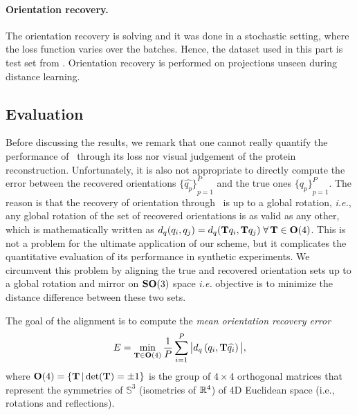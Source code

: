 \paragraph{Orientation recovery.}
The orientation recovery is solving  and it was done in a stochastic setting, where the loss function varies over the batches.
Hence, the dataset used in this part is test set from .
Orientation recovery is performed on projections unseen during distance learning.

\subsection{Evaluation}\label{sec:results:evaluation}



Before discussing the results, we remark that one cannot really quantify the performance of~ through its loss nor visual judgement of the protein reconstruction.
Unfortunately, it is also not appropriate to directly compute the error between the recovered orientations ${\big\{\widehat{q_p}\big\}}_{p=1}^P$ and the true ones ${\big\{q_p\big\}}_{p=1}^P$.
The reason is that the recovery of orientation through~ is up to a global rotation, \textit{i.e.}, any global rotation of the set of recovered orientations is as valid as any other, which is mathematically written as $d_q(q_i, q_j) = d_q(\mathbf{T} q_i , \mathbf{T} q_j) \; \forall \, \mathbf{T} \in \mathrm{\mathbf{O}}(4)$.
This is not a problem for the ultimate application of our scheme, but it complicates the quantitative evaluation of its performance in synthetic experiments.
We circumvent this problem by aligning the true and recovered orientation sets up to a global rotation and mirror on $\mathrm{\mathbf{SO}}(3)$ space \textit{i.e.} objective is to minimize the distance difference between these two sets.

The goal of the alignment is to compute the \textit{mean orientation recovery error}
\begin{equation}
    E = \min_{\mathbf{T} \in \mathrm{\mathbf{O}}(4)} \frac{1}{P} \sum_{i=1}^P \big| d_q\left( q_i, \mathbf{T} \widehat{q_i} \right) \big|,
    \label{eqn:orientation-recovery-error}
\end{equation}
where $\mathrm{\mathbf{O}}(4) = \{\mathbf{T} \, | \det(\mathbf{T}) = \pm 1\}$ is the group of $4 \times 4$ orthogonal matrices that represent the symmetries of $\mathbb{S}^3$ (isometries of $\mathbb{R}^4$) of 4D Euclidean space (i.e., rotations and reflections).


